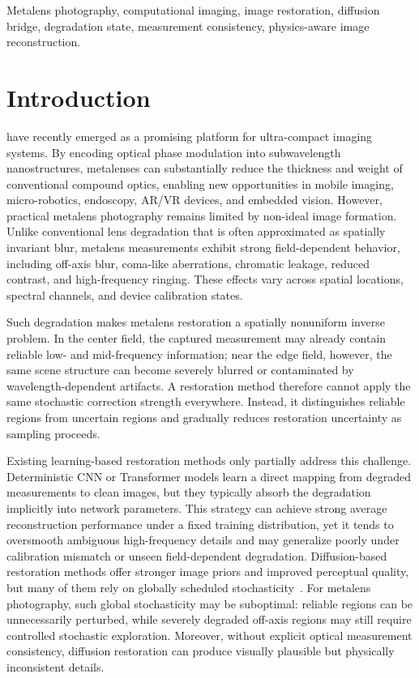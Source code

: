 \documentclass[journal]{IEEEtran}
\begin{document}
\begin{IEEEkeywords}
Metalens photography, computational imaging, image restoration, diffusion bridge, degradation state, measurement consistency, physics-aware image reconstruction.
\end{IEEEkeywords}

\section{Introduction}
 have recently emerged as a promising platform for ultra-compact imaging systems. By encoding optical phase modulation into subwavelength nanostructures, metalenses can substantially reduce the thickness and weight of conventional compound optics, enabling new opportunities in mobile imaging, micro-robotics, endoscopy, AR/VR devices, and embedded vision. However, practical metalens photography remains limited by non-ideal image formation. Unlike conventional lens degradation that is often approximated as spatially invariant blur, metalens measurements exhibit strong field-dependent behavior, including off-axis blur, coma-like aberrations, chromatic leakage, reduced contrast, and high-frequency ringing. These effects vary across spatial locations, spectral channels, and device calibration states.

Such degradation makes metalens restoration a spatially nonuniform inverse problem. In the center field, the captured measurement may already contain reliable low- and mid-frequency information; near the edge field, however, the same scene structure can become severely blurred or contaminated by wavelength-dependent artifacts. A restoration method therefore cannot apply the same stochastic correction strength everywhere. Instead, it distinguishes reliable regions from uncertain regions and gradually reduces restoration uncertainty as sampling proceeds.

Existing learning-based restoration methods only partially address this challenge. Deterministic CNN or Transformer models learn a direct mapping from degraded measurements to clean images, but they typically absorb the degradation implicitly into network parameters. This strategy can achieve strong average reconstruction performance under a fixed training distribution, yet it tends to oversmooth ambiguous high-frequency details and may generalize poorly under calibration mismatch or unseen field-dependent degradation. Diffusion-based restoration methods offer stronger image priors and improved perceptual quality, but many of them rely on globally scheduled stochasticity~\cite{ho2020ddpm,song2021score,saharia2022palette,kawar2022ddrm,chung2023dps}. For metalens photography, such global stochasticity may be suboptimal: reliable regions can be unnecessarily perturbed, while severely degraded off-axis regions may still require controlled stochastic exploration. Moreover, without explicit optical measurement consistency, diffusion restoration can produce visually plausible but physically inconsistent details.
\end{document}
